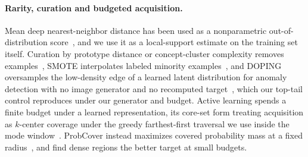 \documentclass{article}
\begin{document}
\paragraph{Rarity, curation and budgeted acquisition.}
Mean deep nearest-neighbor distance has been used as a nonparametric out-of-distribution score~\citep{sun2022out}, and we use it as a local-support estimate on the training set itself. Curation by prototype distance or concept-cluster complexity removes examples~\citep{sorscher2022beyond,abbas2024effective,whang2023data}, SMOTE interpolates labeled minority examples~\citep{chawla2002smote}, and DOPING oversamples the low-density edge of a learned latent distribution for anomaly detection with no image generator and no recomputed target~\citep{lim2018doping}, which our top-tail control reproduces under our generator and budget. Active learning spends a finite budget under a learned representation, its core-set form treating acquisition as $k$-center coverage under the greedy farthest-first traversal we use inside the mode window~\citep{sener2018active,gonzalez1985clustering}. ProbCover instead maximizes covered probability mass at a fixed radius~\citep{yehuda2022covering}, and \citet{hacohen2022budget} find dense regions the better target at small budgets.
\end{document}
